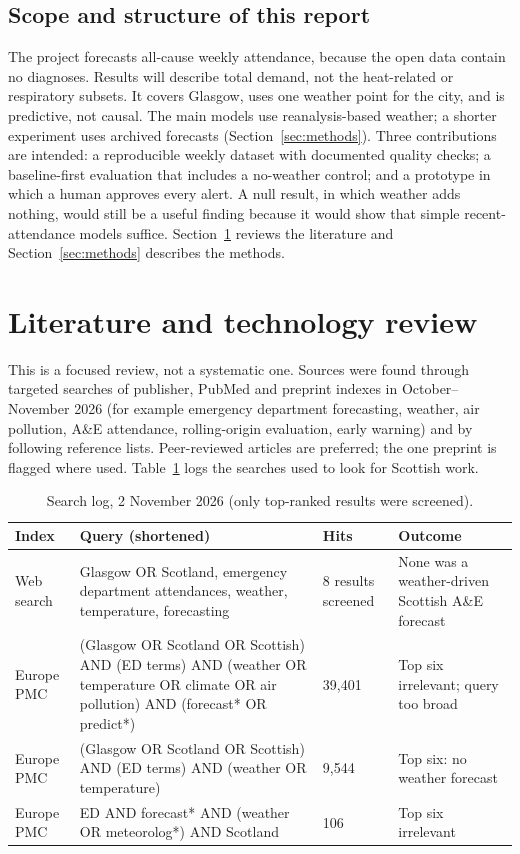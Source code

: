 \documentclass[12pt]{article}
\begin{document}
\subsection{Scope and structure of this report}
The project forecasts all-cause weekly attendance, because the open data contain no diagnoses. Results will describe total demand, not the heat-related or respiratory subsets. It covers Glasgow, uses one weather point for the city, and is predictive, not causal. The main models use reanalysis-based weather; a shorter experiment uses archived forecasts (Section~\ref{sec:methods}). Three contributions are intended: a reproducible weekly dataset with documented quality checks; a baseline-first evaluation that includes a no-weather control; and a prototype in which a human approves every alert. A null result, in which weather adds nothing, would still be a useful finding because it would show that simple recent-attendance models suffice. Section~\ref{sec:lit} reviews the literature and Section~\ref{sec:methods} describes the methods.

\section{Literature and technology review}\label{sec:lit}
This is a focused review, not a systematic one. Sources were found through targeted searches of publisher, PubMed and preprint indexes in October--November 2026 (for example emergency department forecasting, weather, air pollution, A\&E attendance, rolling-origin evaluation, early warning) and by following reference lists. Peer-reviewed articles are preferred; the one preprint \parencite{garciacrespi2026} is flagged where used. Table~\ref{table:search} logs the searches used to look for Scottish work.

\begin{table}[h!]
\centering
\small
\begin{tabular}{|p{1.8cm}|p{6.2cm}|p{1.6cm}|p{3.4cm}|}
 \hline
 Index & Query (shortened) & Hits & Outcome \\
 \hline
 Web search & Glasgow OR Scotland, emergency department attendances, weather, temperature, forecasting & 8 results screened & None was a weather-driven Scottish A\&E forecast \\
 Europe PMC & (Glasgow OR Scotland OR Scottish) AND (ED terms) AND (weather OR temperature OR climate OR air pollution) AND (forecast* OR predict*) & 39,401 & Top six irrelevant; query too broad \\
 Europe PMC & (Glasgow OR Scotland OR Scottish) AND (ED terms) AND (weather OR temperature) & 9,544 & Top six: no weather forecast \\
 Europe PMC & ED AND forecast* AND (weather OR meteorolog*) AND Scotland & 106 & Top six irrelevant \\
 \hline
\end{tabular}
\caption{Search log, 2 November 2026 (only top-ranked results were screened).}
\label{table:search}
\end{table}
\end{document}
